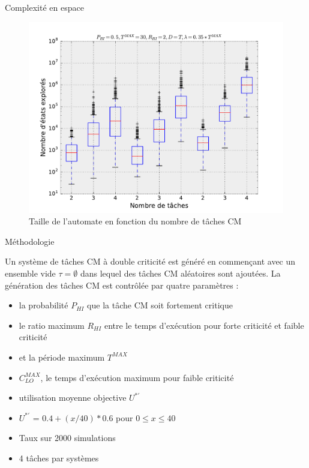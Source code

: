 \documentclass{bredelebeamer}
\begin{document}
\begin{frame}{Complexité en espace}
\begin{figure}[h]
\includegraphics[width=\textwidth,height=0.8\textheight,keepaspectratio]{./results/taskvssize.pdf}
\caption{Taille de l'automate en fonction du nombre de tâches CM}
\label{res:nbetat}
\end{figure}
\end{frame}


\begin{frame}{Méthodologie}
\begin{block}{}

Un système de tâches CM à double criticité est généré en commençant avec un ensemble vide $\tau = \emptyset$ dans lequel des tâches CM aléatoires sont ajoutées. La génération des tâches CM est contrôlée par quatre paramètres :
\begin{itemize}
\item la probabilité $P_{HI}$ que la tâche CM soit fortement critique
\item le ratio maximum $R_{HI}$ entre le temps d'exécution pour forte criticité et faible criticité
\item et la période maximum $T^{MAX}$
\item $C^{MAX}_{LO}$, le temps d'exécution maximum pour faible criticité
\item utilisation moyenne objective $U^{*'}$
\end{itemize}

\end{block}

\begin{itemize}
\item $U^{*'}$ = $0.4 + (x/40) * 0.6$ pour $0 \le x \le 40$
\item Taux sur 2000 simulations
\item 4 tâches par systèmes
\end{itemize}


\end{frame}
\end{document}
